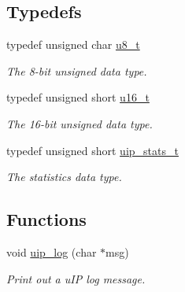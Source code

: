 \subsection*{Typedefs}
\begin{CompactItemize}
\item 
typedef unsigned char \hyperlink{a00070_ge081489b4906f65a3cb18e9fbe9f8d23}{u8\_\-t}
\begin{CompactList}\small\item\em The 8-bit unsigned data type. \item\end{CompactList}\item 
typedef unsigned short \hyperlink{a00070_gfc6499c1f28697aa3bfc2804d496fd11}{u16\_\-t}
\begin{CompactList}\small\item\em The 16-bit unsigned data type. \item\end{CompactList}\item 
typedef unsigned short \hyperlink{a00070_g727459e5c4f777543c81ffffa3df3f0c}{uip\_\-stats\_\-t}
\begin{CompactList}\small\item\em The statistics data type. \item\end{CompactList}\end{CompactItemize}
\subsection*{Functions}
\begin{CompactItemize}
\item 
void \hyperlink{a00076_gb58e1ceb7cb73ca2bcd73146b6c1b4e7}{uip\_\-log} (char $\ast$msg)
\begin{CompactList}\small\item\em Print out a u\-IP log message. \item\end{CompactList}\end{CompactItemize}
